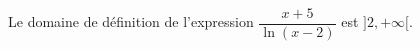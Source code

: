 Le domaine de définition de l'expression $\dfrac{x+5}{\ln(x-2)}$ est $]2,+\infty[$.

\begin{reponses}
\end{reponses}

